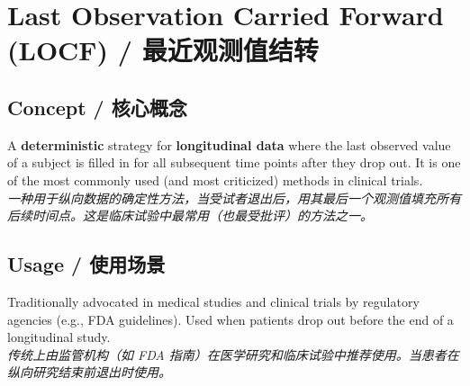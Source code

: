\documentclass[9pt, a4paper]{article}
\begin{document}
\section{Last Observation Carried Forward (LOCF) / 最近观测值结转}

\subsection{Concept / 核心概念}
\begin{tcolorbox}[defbox]
    A \textbf{deterministic} strategy for \textbf{longitudinal data} where the last observed value of a subject is filled in for all subsequent time points after they drop out. It is one of the most commonly used (and most criticized) methods in clinical trials.\\
    \textit{一种用于纵向数据的确定性方法，当受试者退出后，用其最后一个观测值填充所有后续时间点。这是临床试验中最常用（也最受批评）的方法之一。}
\end{tcolorbox}

\subsection{Usage / 使用场景}
Traditionally advocated in medical studies and clinical trials by regulatory agencies (e.g., FDA guidelines). Used when patients drop out before the end of a longitudinal study.\\
\textit{传统上由监管机构（如 FDA 指南）在医学研究和临床试验中推荐使用。当患者在纵向研究结束前退出时使用。}
\end{document}
